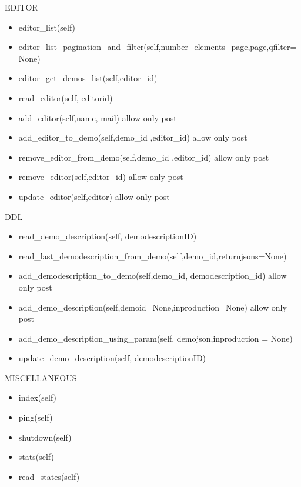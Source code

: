 EDITOR

\begin{itemize}
\item  editor\_list(self)
\item  editor\_list\_pagination\_and\_filter(self,number\_elements\_page,page,qfilter=None)
\item  editor\_get\_demos\_list(self,editor\_id)
\item  read\_editor(self, editorid)
\item  add\_editor(self,name, mail)
allow only post
\item  add\_editor\_to\_demo(self,demo\_id ,editor\_id)
allow only post
\item  remove\_editor\_from\_demo(self,demo\_id ,editor\_id)
allow only post
\item  remove\_editor(self,editor\_id)
allow only post
\item  update\_editor(self,editor)
allow only post
\end{itemize}

DDL

\begin{itemize}
\item  read\_demo\_description(self, demodescriptionID)
\item  read\_last\_demodescription\_from\_demo(self,demo\_id,returnjsons=None)
\item  add\_demodescription\_to\_demo(self,demo\_id, demodescription\_id)
allow only post
\item  add\_demo\_description(self,demoid=None,inproduction=None)
allow only post
\item  add\_demo\_description\_using\_param(self, demojson,inproduction = None)
\item  update\_demo\_description(self, demodescriptionID)
\end{itemize}

MISCELLANEOUS

\begin{itemize}
\item  index(self)
\item  ping(self)
\item  shutdown(self)
\item  stats(self)
\item  read\_states(self)
\end{itemize}
